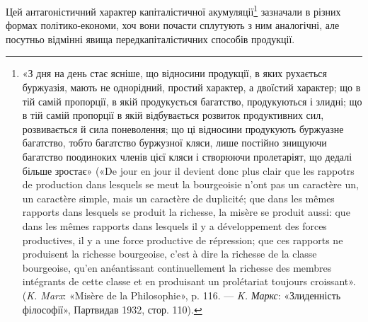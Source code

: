 Цей антагоністичний характер капіталістичної акумуляції\footnote{
«З дня на день стає ясніше, що відносини продукції, в яких
рухається буржуазія, мають не однорідний, простий характер, а двоїстий
характер; що в тій самій пропорції, в якій продукується багатство,
продукуються і злидні; що в тій самій пропорції в якій відбувається розвиток
продуктивних сил, розвивається й сила поневолення; що ці відносини
продукують буржуазне багатство, тобто багатство буржузної кляси, лише
постійно знищуючи багатство поодиноких членів цієї кляси і створюючи
пролетаріят, що дедалі більше зростає» («De jour en jour il devient donc
plus clair que les rappotrs de production dans lesquels se meut la bourgeoisie
n’ont pas un caractère un, un caractère simple, mais un caractère de duplicité;
que dans les mêmes rapports dans lesquels se produit la richesse, la
misère se produit aussi: que dans les mêmes rapports dans lesquels il y a
développement des forces productives, il y a une force productive de répression;
que ces rapports ne produisent la richesse bourgeoise, c’est à dire
la richesse de la classe bourgeoise, qu’en anéantissant continuellement la
richesse des membres intégrants de cette classe et en produisant un prolétariat
toujours croissant». (\emph{K. Marx}: «Misère de la Philosophie», p. 116.
— \emph{K. Маркс}: «Злиденність філософії», Партвидав 1932, стор. 110).
}
зазначали в різних формах політико-економи, хоч вони почасти
сплутують з ним аналогічні, але посутньо відмінні явища передкапіталістичних
способів продукції.

